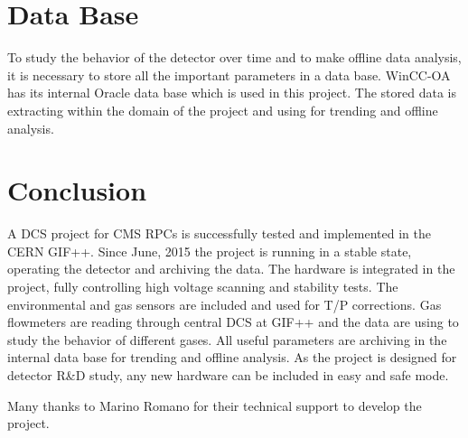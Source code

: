 \documentclass[a4paper,11pt]{article}
\begin{document}
\section{Data Base}
To study the behavior of the detector over time and to make offline data analysis, it is necessary to store all the important parameters in a data base. WinCC-OA has its internal Oracle data base which is used in this project. The stored data is extracting within the domain of the project and using for trending and offline analysis.  

\section{Conclusion} 
A DCS project for CMS RPCs is successfully tested and implemented in the CERN GIF++. Since June, 2015 the project is running in a stable state, operating the detector and archiving the data. The hardware is integrated in the project, fully controlling high voltage scanning and stability tests. The environmental and gas sensors are included and used for T/P corrections. Gas flowmeters are reading through central DCS at GIF++ and the data are using to study the behavior of different gases. All useful parameters are archiving in the internal data base for trending and offline analysis. As the project is designed for detector R\&D study, any new hardware can be included in easy and safe mode.  

\acknowledgments
Many thanks to Marino Romano for their technical support to develop the project.   

\end{document}
